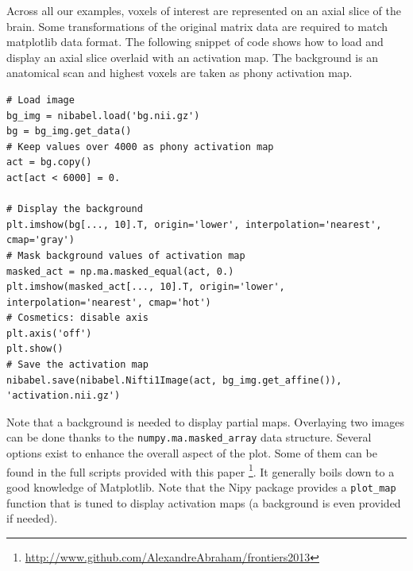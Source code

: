 \documentclass{frontiersSCNS} %
\newcommand{\alex}[1]{\todo[inline, color=green!40]{#1}}
\begin{document}
Across all our examples, voxels of interest are represented on an axial slice of
the brain. Some transformations of the original matrix data are required to match
matplotlib data format. The following snippet of code shows how to load and
display an axial slice overlaid with an activation map. The background is an
anatomical scan and highest voxels are taken as phony activation map.

\begin{lstlisting}
# Load image
bg_img = nibabel.load('bg.nii.gz')
bg = bg_img.get_data()
# Keep values over 4000 as phony activation map
act = bg.copy()
act[act < 6000] = 0.

# Display the background
plt.imshow(bg[..., 10].T, origin='lower', interpolation='nearest', cmap='gray')
# Mask background values of activation map
masked_act = np.ma.masked_equal(act, 0.)
plt.imshow(masked_act[..., 10].T, origin='lower', interpolation='nearest', cmap='hot')
# Cosmetics: disable axis
plt.axis('off')
plt.show()
# Save the activation map
nibabel.save(nibabel.Nifti1Image(act, bg_img.get_affine()), 'activation.nii.gz')
\end{lstlisting}

Note that a background is needed to display partial maps. Overlaying two images
can be done thanks to the \texttt{numpy.ma.masked\_array} data structure.
Several options exist to enhance the overall aspect of the plot.
Some of them can be found in the full scripts provided with this paper
\footnote{\url{http://www.github.com/AlexandreAbraham/frontiers2013}}. It generally
boils down to a good knowledge of Matplotlib. Note that the Nipy package provides a
\texttt{plot\_map} function that is tuned to display activation maps (a
background is even provided if needed).




\end{document}
